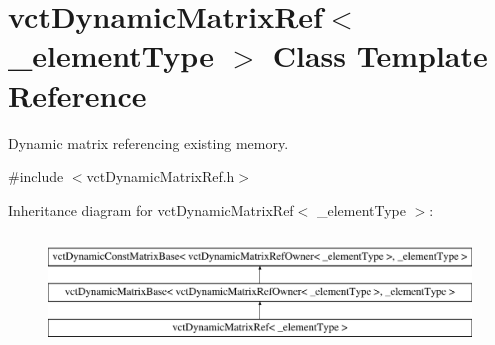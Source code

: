 \hypertarget{classvct_dynamic_matrix_ref}{\section{vct\-Dynamic\-Matrix\-Ref$<$ \-\_\-element\-Type $>$ Class Template Reference}
\label{classvct_dynamic_matrix_ref}
}


Dynamic matrix referencing existing memory.  




{\ttfamily \#include $<$vct\-Dynamic\-Matrix\-Ref.\-h$>$}

Inheritance diagram for vct\-Dynamic\-Matrix\-Ref$<$ \-\_\-element\-Type $>$\-:\begin{figure}[H]
\begin{center}
\leavevmode
\includegraphics[height=3.000000cm]{d6/dbd/classvct_dynamic_matrix_ref}
\end{center}
\end{figure}
